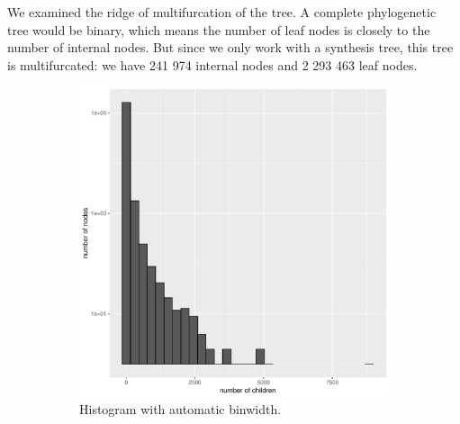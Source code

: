       We examined the ridge of multifurcation of the tree. A complete phylogenetic tree would be 
        binary, which means the number of leaf nodes is closely to the number of internal nodes. But 
        since we only work with a synthesis tree, this tree is multifurcated: we have 241 974 internal 
        nodes and 2 293 463 leaf nodes. \\
      \begin{figure}[h]
        \centering
        \begin{subfigure}[b]{0.5\textwidth}
          \includegraphics[width=\textwidth]{Figures/multifurc.pdf}
          \caption{Histogram with automatic binwidth. \\ ~ \\ ~}
        \end{subfigure}
        ~~~ %
        \begin{subfigure}[b]{0.42\textwidth}

\end{subfigure}
\end{figure}
